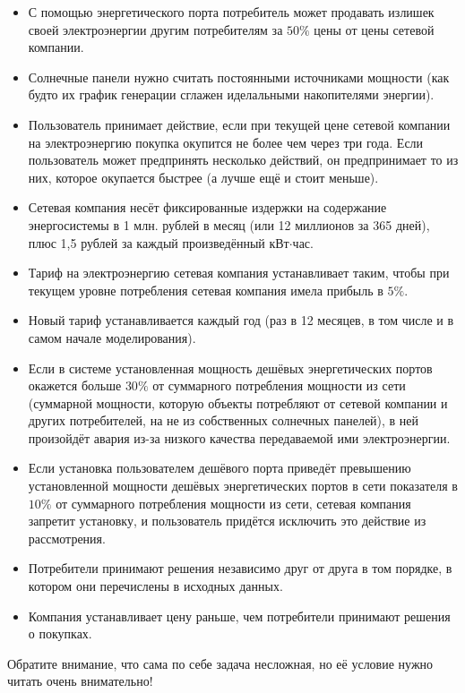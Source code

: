 \begin{itemize}
    \item С помощью энергетического порта потребитель может продавать излишек своей электроэнергии другим потребителям за $50\%$ цены от цены сетевой компании.
    \item Солнечные панели нужно считать постоянными источниками мощности (как будто их график генерации сглажен иделальными накопителями энергии).
    \item Пользователь принимает действие, если при текущей цене сетевой компании на электроэнергию покупка окупится не более чем через три года. Если пользователь может предпринять несколько действий, он предпринимает то из них, которое окупается быстрее (а лучше ещё и стоит меньше).
    \item Сетевая компания несёт фиксированные издержки на содержание энергосистемы в 1 млн. рублей в месяц (или 12 миллионов за 365 дней), плюс 1,5 рублей за каждый произведённый кВт$\cdot$час.
    \item Тариф на электроэнергию сетевая компания устанавливает таким, чтобы при текущем уровне потребления сетевая компания имела прибыль в $5\%$.
    \item Новый тариф устанавливается каждый год (раз в 12 месяцев, в том числе и в самом начале моделирования).
    \item Если в системе установленная мощность дешёвых энергетических портов окажется больше $30\%$ от суммарного потребления мощности из сети (суммарной мощности, которую объекты потребляют от сетевой компании и других потребителей, на не из собственных солнечных панелей), в ней произойдёт авария из-за низкого качества передаваемой ими электроэнергии.
    \item Если установка пользователем дешёвого порта приведёт превышению установленной мощности дешёвых энергетических портов в сети показателя в $10\%$ от суммарного потребления мощности из сети, сетевая компания запретит установку, и пользователь придётся исключить это действие из рассмотрения.
    \item Потребители принимают решения независимо друг от друга в том порядке, в котором они перечислены в исходных данных.
    \item Компания устанавливает цену раньше, чем потребители принимают решения о покупках.
\end{itemize}

Обратите внимание, что сама по себе задача несложная, но её условие нужно читать очень внимательно!

